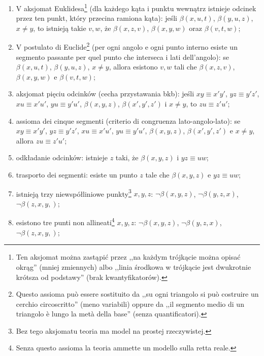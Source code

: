 \begin{enumerate}
      \item V aksjomat Euklidesa\footnote{Ten aksjomat można zastąpić przez ,,na każdym trójkącie można opisać okrąg'' (mniej zmiennych) albo ,,linia środkowa w trójkącie jest dwukrotnie krótsza od podstawy'' (brak kwantyfikatorów).} (dla każdego kąta i punktu wewnątrz istnieje odcinek przez ten punkt, który przecina ramiona kąta): jeśli $\beta(x, u, t)$, $\beta (y, u, z)$, $x \neq y$, to istnieją takie $v, w$, że $\beta(x, z, v)$, $\beta(x, y, w)$ oraz $\beta (v, t, w)$;%
      \item V postulato di Euclide\footnote{Questo assioma può essere sostituito da ,,su ogni triangolo si può costruire un cerchio circoscritto'' (meno variabili) oppure da ,,il segmento medio di un triangolo è lungo la metà della base'' (senza quantificatori).} (per ogni angolo e ogni punto interno esiste un segmento passante per quel punto che interseca i lati dell'angolo): se $\beta(x, u, t)$, $\beta (y, u, z)$, $x \neq y$, allora esistono $v, w$ tali che $\beta(x, z, v)$, $\beta(x, y, w)$ e $\beta (v, t, w)$; %

      \item aksjomat pięciu odcinków (cecha przystawania bkb): jeśli $xy \equiv x'y'$, $yz \equiv y'z'$, $xu \equiv x'u'$, $yu \equiv y'u'$, $\beta (x, y, z)$, $\beta(x', y', z')$ i $x \neq y$, to $zu \equiv z'u'$; %
      \item assioma dei cinque segmenti (criterio di congruenza lato-angolo-lato): se $xy \equiv x'y'$, $yz \equiv y'z'$, $xu \equiv x'u'$, $yu \equiv y'u'$, $\beta (x, y, z)$, $\beta(x', y', z')$ e $x \neq y$, allora $zu \equiv z'u'$; %
%

      \item odkładanie odcinków: istnieje $z$ taki, że $\beta (x, y, z)$ i $yz \equiv uw$; %
      \item trasporto dei segmenti: esiste un punto $z$ tale che $\beta (x, y, z)$ e $yz \equiv uw$; %

      \item istnieją trzy niewspółliniowe punkty\footnote{Bez tego aksjomatu teoria ma model na prostej rzeczywistej.} $x, y, z$: $\neg \beta(x, y, z)$, $\neg \beta(y, z, x)$, $\neg \beta(z, x, y, )$; %
      \item esistono tre punti non allineati\footnote{Senza questo assioma la teoria ammette un modello sulla retta reale.} $x, y, z$: $\neg \beta(x, y, z)$, $\neg \beta(y, z, x)$, $\neg \beta(z, x, y, )$; %


\end{enumerate}
